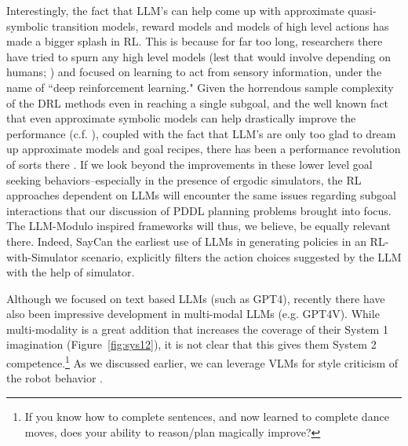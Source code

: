 \documentclass{article}
\newcommand{\rao}[1]{\noindent\textcolor{red}{#1}}
\theoremstyle{plain}
\theoremstyle{definition}
\theoremstyle{remark}
\begin{document}


Interestingly, the fact that LLM's can help come up with approximate quasi-symbolic transition models, reward models and models of high level actions has made a bigger splash in RL. This is because for far too long, researchers there have tried to spurn any high level models (lest that would involve depending on humans; \cite{polanyi-revenge}) and focused on learning to act from sensory information, under the name of ``deep reinforcement learning." Given the horrendous sample complexity of the DRL methods even in reaching a single subgoal, and the well known fact that even approximate symbolic models can help drastically improve the performance (c.f. \cite{lin-icml22}), coupled with the fact that LLM's are only too glad to dream up approximate models and goal recipes, there has been a performance revolution of sorts there \cite{yao2023react,liang2023code,wang2023voyager}. If we look beyond the improvements in these lower level goal seeking behaviors--especially in the presence of ergodic simulators, the RL approaches dependent on LLMs will encounter the same issues regarding subgoal interactions that our discussion of PDDL planning problems brought into focus. The LLM-Modulo inspired frameworks will thus, we believe, be equally relevant there. Indeed, SayCan \cite{ahn2022saycan} the earliest use of LLMs in generating policies in an RL-with-Simulator scenario, explicitly filters the action choices suggested by the LLM with the help of simulator. 


Although we focused on text based LLMs (such as GPT4), recently there have also been impressive development in multi-modal LLMs (e.g. GPT4V). 
While multi-modality is a great addition that increases the coverage of their System 1 imagination (Figure~\ref{fig:sys12}), 
it is not clear that this gives them System 2 competence.\footnote{If you know how to complete sentences, and now learned to complete dance moves, does your ability to reason/plan magically improve?} 
As we
discussed earlier, we can leverage VLMs for style criticism of the robot
behavior \cite{guan2024task}.



\end{document}
